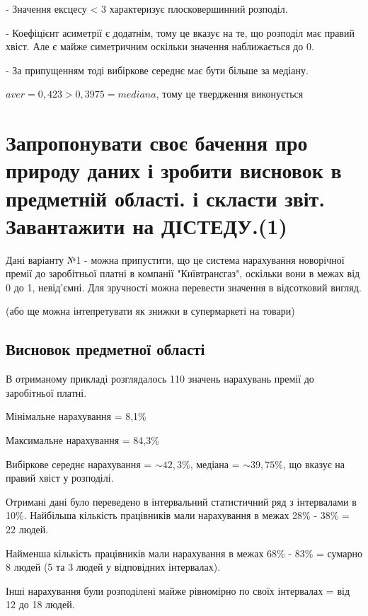 \documentclass[14pt]{extarticle}
\begin{document}
\begin{description}
\item{-} Значення ексцесу < 3  характеризує плосковершинний розподіл.

\item{-} Коефіцієнт асиметрії є додатнім, тому це вказує на те, що розподіл має  правий хвіст. Але є майже симетричним оскільки значення наближається до 0.

\item{-} За припущенням тоді вибіркове середнє має бути більше за медіану.

$ aver = 0,423 >  0,3975 = mediana $, тому це твердження виконується

\end{description}

\section {Запропонувати своє бачення про природу даних і зробити висновок в предметній області. і скласти звіт. Завантажити на ДІСТЕДУ.(1)}

Дані варіанту №1 - можна припустити, що це система нарахування новорічної премії до заробітньої платні в компанії "Київтрансгаз", оскільки вони в межах від 0 до 1, невід'ємні. Для зручності можна перевести значення в відсотковий вигляд.

(або ще можна інтепретувати як знижки в супермаркеті на товари)

\subsection*{Висновок предметної області}

В отриманому прикладі розглядалось 110 значень нарахувань премії до заробітньої платні.

Мінімальне нарахування = 8,1\%

Максимальне нарахування = 84,3\%

Вибіркове середнє нарахування = $\sim 42,3\%$, медіана = $\sim 39,75\%$, що вказує на правий хвіст у розподілі.

Отримані дані було переведено в інтервальний статистичний ряд з інтервалами в 10\%. Найбільша кількість працівників мали нарахування в межах 28\% - 38\% = 22 людей.

Найменша кількість працівників мали нарахування в межах 68\% - 83\% = сумарно 8 людей (5 та 3 людей у відповідних інтервалах).

Інші нарахування були розподілені майже рівномірно по своїх інтервалах = від 12 до 18 людей.
\end{document}
